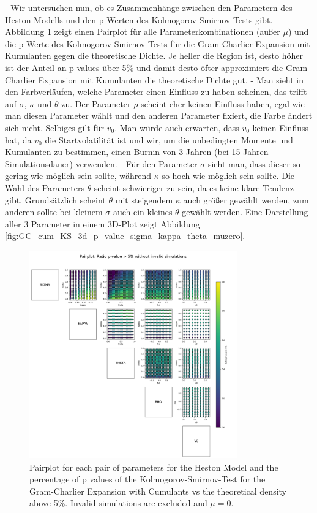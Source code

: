 - Wir untersuchen nun, ob es Zusammenhänge zwischen den Parametern des Heston-Modells und den p Werten des Kolmogorov-Smirnov-Tests gibt. Abbildung \ref{fig:pairplot_GC_cum_KS_muzero} zeigt einen Pairplot für alle Parameterkombinationen (außer $\mu$) und die p Werte des Kolmogorov-Smirnov-Tests für die Gram-Charlier Expansion
mit Kumulanten gegen die theoretische Dichte. Je heller die Region ist, desto höher ist der Anteil an p values über 5\% und damit desto öfter approximiert die Gram-Charlier Expansion mit Kumulanten die theoretische Dichte gut.
- Man sieht in den Farbverläufen, welche Parameter einen Einfluss zu haben scheinen, das trifft auf $\sigma$, $\kappa$ und $\theta$ zu. Der Parameter $\rho$ scheint eher keinen Einfluss haben, egal wie man diesen Parameter wählt und den anderen Parameter fixiert, die Farbe ändert sich nicht. Selbiges gilt für $v_0$. Man würde auch erwarten, dass $v_0$ keinen Einfluss hat, da $v_0$ die Startvolatilität ist und wir, um die unbedingten Momente und Kumulanten zu bestimmen, einen Burnin von 3 Jahren (bei 15 Jahren Simulationsdauer) verwenden. 
- Für den Parameter $\sigma$ sieht man, dass dieser so gering wie möglich sein sollte, während $\kappa$ so hoch wie möglich sein sollte. Die Wahl des Parameters $\theta$ scheint schwieriger zu sein, da es keine klare Tendenz gibt. Grundsätzlich scheint $\theta$ mit steigendem $\kappa$ auch größer gewählt werden, zum anderen sollte bei kleinem $\sigma$ auch ein kleines $\theta$ gewählt werden. Eine Darstellung aller 3 Parameter in einem 3D-Plot zeigt Abbildung \ref{fig:GC_cum_KS_3d_p_value_sigma_kappa_theta_muzero}.

\begin{figure}
    \centering
    \includegraphics[width=0.8\textwidth]{img/pairplot_GC_cum_KS_muzero.png}
    \caption{Pairplot for each pair of parameters for the Heston Model and the percentage of p values of the Kolmogorov-Smirnov-Test for the Gram-Charlier Expansion with Cumulants vs the theoretical density above 5\%. Invalid simulations are excluded and $\mu=0$.}
    \label{fig:pairplot_GC_cum_KS_muzero}
\end{figure}

